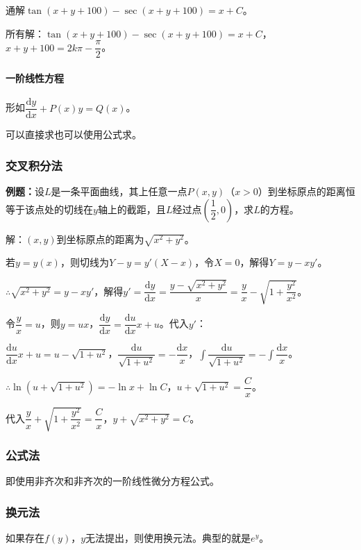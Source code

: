 通解$\tan(x+y+100)-\sec(x+y+100)=x+C$。

所有解：$\tan(x+y+100)-\sec(x+y+100)=x+C$，$x+y+100=2k\pi-\dfrac{\pi}{2}$。

\paragraph{一阶线性方程}

形如$\dfrac{\textrm{d}y}{\textrm{d}x}+P(x)y=Q(x)$。

可以直接求也可以使用公式求。

\subsubsection{交叉积分法}

\textbf{例题：}设$L$是一条平面曲线，其上任意一点$P(x,y)$（$x>0$）到坐标原点的距离恒等于该点处的切线在$y$轴上的截距，且$L$经过点$\left(\dfrac{1}{2},0\right)$，求$L$的方程。

解：$(x,y)$到坐标原点的距离为$\sqrt{x^2+y^2}$。

若$y=y(x)$，则切线为$Y-y=y'(X-x)$，令$X=0$，解得$Y=y-xy'$。

$\therefore\sqrt{x^2+y^2}=y-xy'$，解得$y'=\dfrac{\textrm{d}y}{\textrm{d}x}=\dfrac{y-\sqrt{x^2+y^2}}{x}=\dfrac{y}{x}-\sqrt{1+\dfrac{y^2}{x^2}}$。

令$\dfrac{y}{x}=u$，则$y=ux$，$\dfrac{\textrm{d}y}{\textrm{d}x}=\dfrac{\textrm{d}u}{\textrm{d}x}x+u$。代入$y'$：

$\dfrac{\textrm{d}u}{\textrm{d}x}x+u=u-\sqrt{1+u^2}$，$\dfrac{\textrm{d}u}{\sqrt{1+u^2}}=-\dfrac{\textrm{d}x}{x}$，$\displaystyle{\int\dfrac{\textrm{d}u}{\sqrt{1+u^2}}=-\int\dfrac{\textrm{d}x}{x}}$。

$\therefore\ln(u+\sqrt{1+u^2})=-\ln x+\ln C$，$u+\sqrt{1+u^2}=\dfrac{C}{x}$。

代入$\dfrac{y}{x}+\sqrt{1+\dfrac{y^2}{x^2}}=\dfrac{C}{x}$，$y+\sqrt{x^2+y^2}=C$。

\subsubsection{公式法}

即使用非齐次和非齐次的一阶线性微分方程公式。

\subsubsection{换元法}

如果存在$f(y)$，$y$无法提出，则使用换元法。典型的就是$e^y$。

